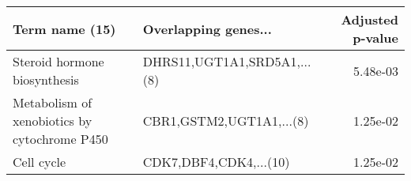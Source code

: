 \begin{tabular}{llr}
\toprule
                              Term name (15) &        Overlapping genes... &  Adjusted p-value \\
\midrule
                Steroid hormone biosynthesis & DHRS11,UGT1A1,SRD5A1,...(8) &          5.48e-03 \\
Metabolism of xenobiotics by cytochrome P450 &    CBR1,GSTM2,UGT1A1,...(8) &          1.25e-02 \\
                                  Cell cycle &      CDK7,DBF4,CDK4,...(10) &          1.25e-02 \\
\bottomrule
\end{tabular}
